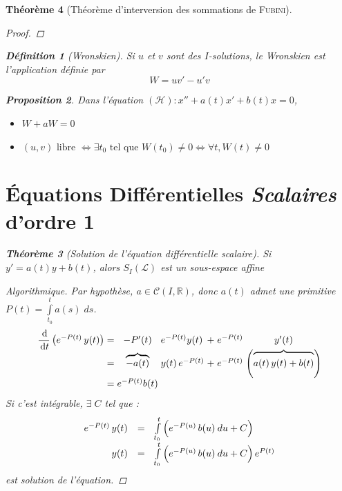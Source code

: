 \documentclass[11pt,a4paper]{report}
\newtheorem{theorem}{Théorème}[chapter]
\newtheorem{prop}[theorem]{Proposition}
\theoremstyle{definition}
\newtheorem{dfn}[theorem]{Définition}
\begin{document}
\begin{theorem}[Théorème d'interversion des sommations de \textsc{Fubini}]
{{\begin{proof}
\end{proof}
\begin{dfn}[Wronskien]
    Si $u$ et $v$ sont des $I$-solutions, le \emph{Wronskien} est l'application définie par
    \begin{equation}
    W = uv' - u'v \tag{Wronskien}
    \end{equation}
\end{dfn}
\begin{prop}
Dans l'équation $(\mathcal{H}) : x'' + a(t)x' + b(t) x =0$,
\begin{itemize}
    \item $W + a W = 0$
    \item $(u,v)\text{ libre }\Leftrightarrow \exists t_0 \text{ tel que } W(t_0) \neq 0 \Leftrightarrow \forall t, W(t) \neq 0$
\end{itemize}
\end{prop}

\section{Équations Différentielles \emph{Scalaires} d'ordre 1}
\begin{theorem}[Solution de l'équation différentielle scalaire]
Si $y'=a(t) y + b(t)$, alors $S_I(\mathscr{L})$ est un sous-espace affine
\end{theorem}
\begin{proof}[Algorithmique]\label{ResolEquDiffScal1}
Par hypothèse, $a \in \mathcal{C}(I,\ensuremath{\mathbb{R}})$, donc $a(t)$ admet une primitive $P(t)=\int \limits_{t_0}^t a(s) \; ds$.
\[\arraycolsep=1.4pt\def\arraystretch{1}
\begin{array}{r c c l l c c}
\dfrac{\,\mathrm{d}}{\,\mathrm{d} t}\left( e^{-P(t)}\, y(t) \right) &=& -P'(t) & e^{-P(t)}y(t) &+& e^{-P(t)}& y'(t)\\
&=& \overbrace{-a(t)}&y(t)\, e^{-P(t)}&+& e^{-P(t)} &\left( \overbrace{\vphantom{{3^3}^3} a(t)\, y(t) +b(t)} \right)\\
&=& e^{-P(t)}b(t)\\
\end{array}\]
Si c'est intégrable, $\exists \; C$ tel que :
\[
\begin{array}{r c l}
e^{-P(t)}\, y(t) &=& \int \limits_{t_0}^t \left( \vphantom{{3^3}^3} e^{-P(u)}\, b(u) \: du + C \right)\\
y(t) &=& \int\limits_{t_0}^t \left( \vphantom{{3^3}^3} e^{-P(u)}\, b(u) \: du + C \right) e^{P(t)}
\end{array}
\] est solution de l'équation.
\end{proof}
%
}}
\end{theorem}
\end{document}
